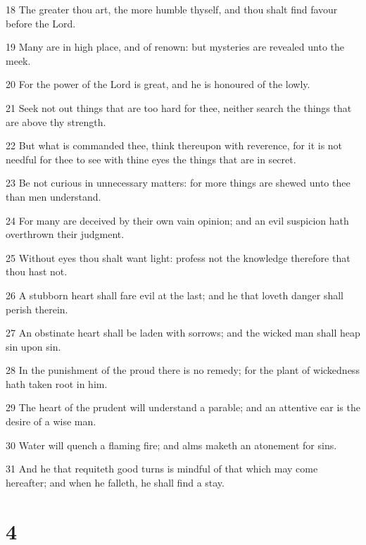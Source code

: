 \par 18 The greater thou art, the more humble thyself, and thou shalt find favour before the Lord.
\par 19 Many are in high place, and of renown: but mysteries are revealed unto the meek.
\par 20 For the power of the Lord is great, and he is honoured of the lowly.
\par 21 Seek not out things that are too hard for thee, neither search the things that are above thy strength.
\par 22 But what is commanded thee, think thereupon with reverence, for it is not needful for thee to see with thine eyes the things that are in secret.
\par 23 Be not curious in unnecessary matters: for more things are shewed unto thee than men understand.
\par 24 For many are deceived by their own vain opinion; and an evil suspicion hath overthrown their judgment.
\par 25 Without eyes thou shalt want light: profess not the knowledge therefore that thou hast not.
\par 26 A stubborn heart shall fare evil at the last; and he that loveth danger shall perish therein.
\par 27 An obstinate heart shall be laden with sorrows; and the wicked man shall heap sin upon sin.
\par 28 In the punishment of the proud there is no remedy; for the plant of wickedness hath taken root in him.
\par 29 The heart of the prudent will understand a parable; and an attentive ear is the desire of a wise man.
\par 30 Water will quench a flaming fire; and alms maketh an atonement for sins.
\par 31 And he that requiteth good turns is mindful of that which may come hereafter; and when he falleth, he shall find a stay.

\chapter{4}

